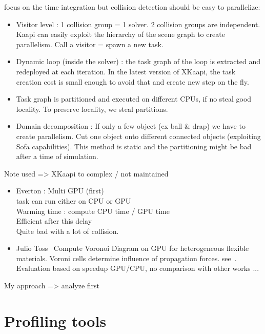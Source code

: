 focus on the time integration but collision detection should be easy to parallelize:
\begin{itemize}
    \item Visitor level : 1 collision group = 1 solver. 2 collision groups are
        independent. Kaapi can easily exploit the hierarchy of the scene graph
        to create parallelism. Call a visitor = spawn a new task.
    \item Dynamic loop (inside the solver) : the task graph of the loop is
        extracted and redeployed at each iteration. In the latest version of
        XKaapi, the task creation cost is small enough to avoid that and create
        new step on the fly.
    \item Task graph is partitioned and executed on different CPUs, if no steal
        good locality. To preserve locality, we steal partitions.
    \item Domain decomposition : If only a few object (ex ball \& drap) we have
        to create parallelism. Cut one object onto different connected objects
        (exploiting Sofa capabilities). This method is static and the
        partitioning might be bad after a time of simulation.
\end{itemize}
Note used => XKaapi to complex / not maintained

\begin{itemize}
        \item Everton : Multi GPU (first)\\
        task can run either on CPU or GPU\\
        Warming time : compute CPU time / GPU time\\
        Efficient after this delay\\
        Quite bad with a lot of collision.

    \item Julio Toss~\cite{Toss13Parallel,Toss14Parallel} Compute Voronoi Diagram on GPU for
        heterogeneous flexible materials. Voroni cells determine influence of
        propagation forces. see~\cite{Faure11Sparse}. Evaluation based on
        speedup GPU/CPU, no comparison with other works ...
\end{itemize}

My approach => analyze first

\section{Profiling tools}
\label{sec:prof-tools}


